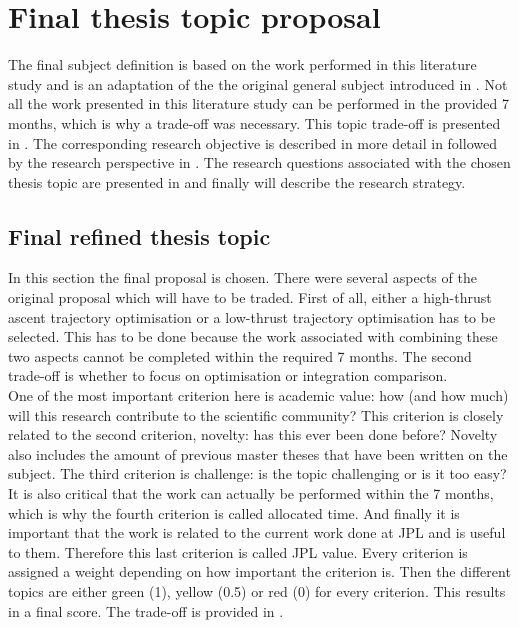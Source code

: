 \chapter{Final thesis topic proposal} %
\label{ch:findef}
The final subject definition is based on the work performed in this literature study and is an adaptation of the the original general subject introduced in . Not all the work presented in this literature study can be performed in the provided 7 months, which is why a trade-off was necessary. This topic trade-off is presented in . The corresponding research objective is described in more detail in  followed by the research perspective in . The research questions associated with the chosen thesis topic are presented in  and finally  will describe the research strategy.   




\section{Final refined thesis topic}
\label{sec:finrefthes}
In this section the final proposal is chosen. There were several aspects of the original proposal which will have to be traded. First of all, either a high-thrust ascent trajectory optimisation or a low-thrust trajectory optimisation has to be selected. This has to be done because the work associated with combining these two aspects cannot be completed within the required 7 months. The second trade-off is whether to focus on optimisation or integration comparison. \\
One of the most important criterion here is academic value: how (and how much) will this research contribute to the scientific community? This criterion is closely related to the second criterion, novelty: has this ever been done before? Novelty also includes the amount of previous master theses that have been written on the subject. The third criterion is challenge: is the topic challenging or is it too easy? It is also critical that the work can actually be performed within the 7 months, which is why the fourth criterion is called allocated time. And finally it is important that the work is related to the current work done at \ac{JPL} and is useful to them. Therefore this last criterion is called \ac{JPL} value. Every criterion is assigned a weight depending on how important the criterion is. Then the different topics are either green (1), yellow (0.5) or red (0) for every criterion. This results in a final score. The trade-off is provided in .


